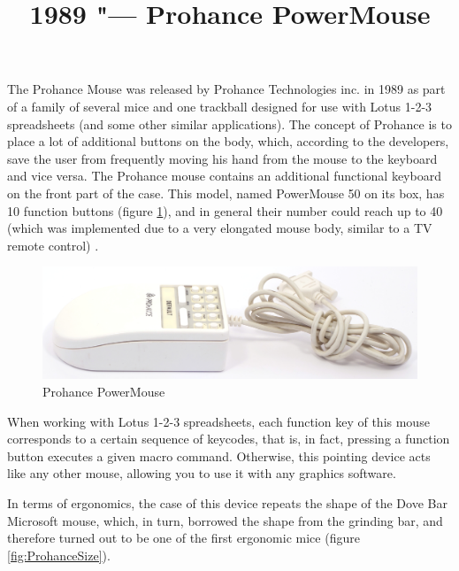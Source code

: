 \documentclass[11pt, a4paper]{article}
\begin{document}
\title{1989 "--- Prohance PowerMouse}
\date{}
\maketitle
{}
The Prohance Mouse was released by Prohance Technologies inc. in 1989 as part of a family of several mice and one trackball designed for use with Lotus 1-2-3 spreadsheets (and some other similar applications). The concept of Prohance is to place a lot of additional buttons on the body, which, according to the developers, save the user from frequently moving his hand from the mouse to the keyboard and vice versa. The Prohance mouse contains an additional functional keyboard on the front part of the case. This model, named PowerMouse 50 on its box, has 10 function buttons (figure \ref{fig:ProhancePhoto}), and in general their number could reach up to 40 (which was implemented due to a very elongated mouse body, similar to a TV remote control) \cite{livingston}.

\begin{figure}[h]
    \centering
    \includegraphics[scale=0.55]{1989_prohance_powermouse/pic_30.jpg}
    \caption{Prohance PowerMouse}
    \label{fig:ProhancePhoto}
\end{figure}

When working with Lotus 1-2-3 spreadsheets, each function key of this mouse corresponds to a certain sequence of keycodes, that is, in fact, pressing a function button executes a given macro command. Otherwise, this pointing device acts like any other mouse, allowing you to use it with any graphics software.

In terms of ergonomics, the case of this device repeats the shape of the Dove Bar Microsoft mouse, which, in turn, borrowed the shape from the grinding bar, and therefore turned out to be one of the first ergonomic mice (figure \ref{fig:ProhanceSize}).
\end{document}
